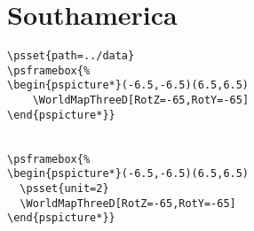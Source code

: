 \documentclass[12pt,a4paper]{article} %
\begin{document}
\section*{Southamerica}

\begin{verbatim}
\psset{path=../data}
\psframebox{%
\begin{pspicture*}(-6.5,-6.5)(6.5,6.5)
    \WorldMapThreeD[RotZ=-65,RotY=-65]
\end{pspicture*}}


\psframebox{%
\begin{pspicture*}(-6.5,-6.5)(6.5,6.5)
  \psset{unit=2}
  \WorldMapThreeD[RotZ=-65,RotY=-65]
\end{pspicture*}}
\end{verbatim}



\end{document}
